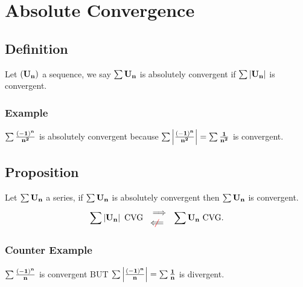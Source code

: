 \documentclass[notitlepage]{math}
\begin{document}
\section{Absolute Convergence}
\subsection{Definition}
Let $\bf (U_n)$ a sequence, we say $\bf \sum U_n$ is absolutely convergent if $\bf \sum \left\lvert U_n \right\rvert$ is convergent.
\subsubsection{Example}
$\bf \sum \frac{(-1)^n}{n^2}$ is absolutely convergent because $\bf \sum \left\lvert \frac{(-1)^n}{n^2} \right\rvert = \sum \frac{1}{n^2}$ is convergent.
\subsection{Proposition}
Let $\bf \sum U_n$ a series, if $\bf \sum U_n$ is absolutely convergent then $\bf \sum U_n$ is convergent.
\[\bf \sum \left\lvert U_n \right\rvert \text{ CVG } \begin{array}{l}  \implies \\ {\color{red}\centernot{\color{black}\Longleftarrow}} \end{array} \bf \sum U_n \text{ CVG.}\]
\subsubsection{Counter Example}
$\bf \sum \frac{(-1)^n}{n}$ is convergent BUT $\bf \sum \left\lvert \frac{(-1)^n}{n} \right\rvert = \sum \frac{1}{n}$ is divergent.
\end{document}
